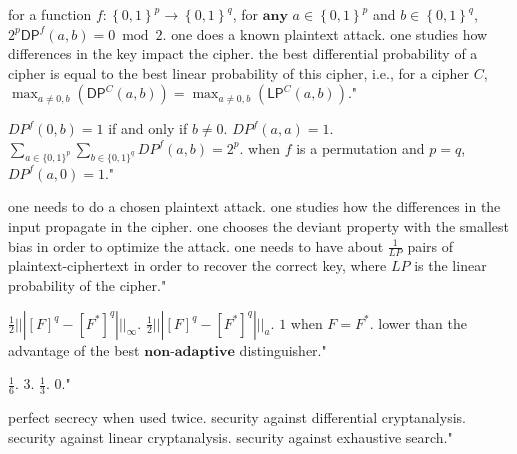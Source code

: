 {for a function $f:\left\{ 0,1 \right\}^p \rightarrow \left\{ 0,1 \right\}^q$, for $ \textbf{any} $ $a\in\left\{ 0,1 \right\}^p$ and $b \in \left\{ 0,1 \right\}^q$, $2^p \textsf{DP}^f(a,b) =0 \bmod{2}$.}
{one does a known plaintext attack.}
{one studies how differences in the key impact the cipher.}
{the best differential probability of a cipher is equal to the best linear probability of this cipher, i.e., for a cipher $C$, $\max_{a\neq 0,b}(\textsf{DP}^C(a,b))=\max_{a\neq 0,b}(\textsf{LP}^C(a,b))$."}

{$DP^f(0,b) = 1$ if and only if $b \not= 0$.}
{$DP^f(a,a) =1$.}
{$\sum_{a \in \{0,1\}^p} \sum_{b \in \{0,1\}^q} DP^f(a,b)= 2^p $.}
{when $f$ is a permutation and $p=q$, $DP^f(a,0) = 1$."}

{one needs to do a chosen plaintext attack.}
{one studies how the differences in the input propagate in the cipher.}
{one chooses the deviant property with the smallest bias in order to optimize the attack.}
{one needs to have about $\frac{1}{LP}$ pairs of plaintext-ciphertext in order to recover the correct key, where $LP$ is the linear probability of the cipher."}

{$\frac{1}{2}|||[F]^q - [F^*]^q |||_{\infty}$.}
{$\frac{1}{2}|||[F]^q - [F^*]^q |||_{a}$.}
{$1$ when $F = F^*$.}
{lower than the advantage of the best $ \textbf{non-adaptive} $ distinguisher."}

{$\frac{1}{6}$.}
{$3$.}
{$\frac{1}{3}$.}
{$0$."}

{perfect secrecy when used twice.}
{security against differential cryptanalysis.}
{security against linear cryptanalysis.}
{security against exhaustive search."}

